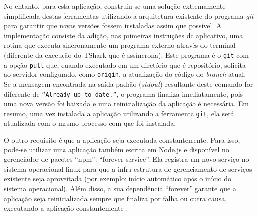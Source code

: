 No entanto, para esta aplicação, construiu-se uma solução extremamente
simplificada destas ferramentas utilizando a arquitetura existente do programa
\emph{git} para garantir que novas versões fossem instaladas assim que possível.
A implementação consiste da adição, nas primeiras instruções do aplicativo,
uma rotina que executa sincronamente um programa externo através do terminal
(diferente da execução do TShark que é assíncrona). Este programa é
o \texttt{git} com a opção \texttt{pull} que, quando executado em um diretório que
é repositório, solicita ao servidor configurado, como \texttt{origin}, a atualização
do código do \emph{branch} atual. Se a mensagem encontrada na saída padrão
(\emph{stdout}) resultante deste comando for diferente de
\texttt{``Already up-to-date.''}, o programa finaliza imediatamente, pois uma nova
versão foi baixada e uma reinicialização da aplicação é necessária.
Em resumo, uma vez instalada a aplicação utilizando a ferramenta \texttt{git}, ela
será atualizada com o mesmo processo com que foi instalada.

O outro requisito é que a aplicação seja executada constantemente. Para isso,
pode-se utilizar uma aplicação também escrita em Node.js e disponível no
gerenciador de pacotes ``npm'': ``forever-service''. Ela registra um novo serviço no sistema operacional
linux para que a infra-estrutura de gerenciamento de serviços existente seja
aproveitada (por exemplo: início automático após o início do sistema operacional). Além disso, a sua dependência
``forever'' garante que a aplicação seja reinicializada sempre que finaliza por falha ou outra causa,
executando a aplicação constantemente \cite{forever-service}.

